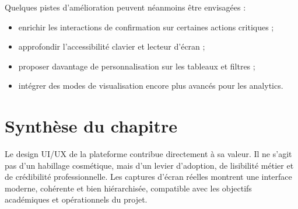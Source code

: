 Quelques pistes d'amélioration peuvent néanmoins être envisagées :
\begin{itemize}
  \item enrichir les interactions de confirmation sur certaines actions critiques ;
  \item approfondir l'accessibilité clavier et lecteur d'écran ;
  \item proposer davantage de personnalisation sur les tableaux et filtres ;
  \item intégrer des modes de visualisation encore plus avancés pour les analytics.
\end{itemize}

\section{Synthèse du chapitre}
Le design UI/UX de la plateforme contribue directement à sa valeur. Il ne s'agit pas d'un habillage cosmétique, mais d'un levier d'adoption, de lisibilité métier et de crédibilité professionnelle. Les captures d'écran réelles montrent une interface moderne, cohérente et bien hiérarchisée, compatible avec les objectifs académiques et opérationnels du projet.









